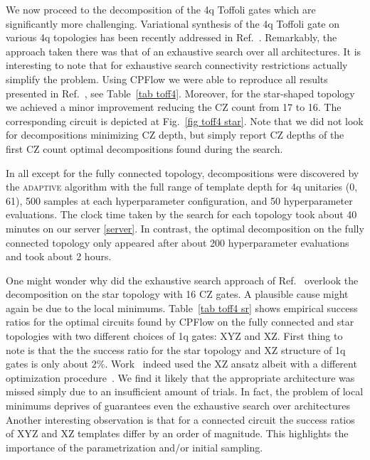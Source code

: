 \documentclass[twocolumn, amsfonts, amssymb, aps, nofootinbib]{revtex4-2}
\newcommand{\CZ}{\textsf{CZ }}
\newcommand{\package}[1]{\textrm {#1 }}
\newcommand{\cpflow}{\package{CPFlow}}
\newcommand{\adaptive}{\textsc{adaptive }}
\begin{document}
We now proceed to the decomposition of the 4q Toffoli gates which are significantly more challenging. Variational synthesis of the 4q Toffoli gate on various 4q topologies has been recently addressed in Ref.~\cite{Nakanishi2021}. Remarkably, the approach taken there was that of an exhaustive search over all architectures. It is interesting to note that for exhaustive search connectivity restrictions actually simplify the problem. Using \cpflow we were able to reproduce all results presented in Ref.~\cite{Nakanishi2021}, see Table~\ref{tab toff4}. Moreover, for the star-shaped topology we achieved a minor improvement reducing the \CZ count from 17 to 16. The corresponding circuit is depicted at Fig.~\ref{fig toff4 star}. Note that we did not look for decompositions minimizing \CZ depth, but simply report \CZ depths of the first \CZ count optimal decompositions found during the search.

In all except for the fully connected topology, decompositions were discovered by the \adaptive algorithm with the full range of template depth for 4q unitaries (0, 61), 500 samples at each hyperparameter configuration, and 50 hyperparameter evaluations. The clock time taken by the search for each topology took about 40 minutes on our server \ref{server}. In contrast, the optimal decomposition on the fully connected topology only appeared after about 200 hyperparameter evaluations and took about 2 hours.

One might wonder why did the exhaustive search approach of Ref.~\cite{Nakanishi2021} overlook the decomposition on the star topology with 16 \CZ gates. A plausible cause might again be due to the local minimums. Table~\ref{tab toff4 sr} shows empirical success ratios for the optimal circuits found by \cpflow on the fully connected and star topologies with two different choices of 1q gates: XYZ and XZ. First thing to note is that the the success ratio for the star topology and XZ structure of 1q gates is only about $2\%$. Work~\cite{Nakanishi2021} indeed used the XZ ansatz albeit with a different optimization procedure~\cite{Nakanishi2020}. We find it likely that the appropriate architecture was missed simply due to an insufficient amount of trials. In fact, the problem of local minimums deprives of guarantees even the exhaustive search over architectures  Another interesting observation is that for a connected circuit the success ratios of XYZ and XZ templates differ by an order of magnitude. This highlights the importance of the parametrization and/or initial sampling.
\end{document}
